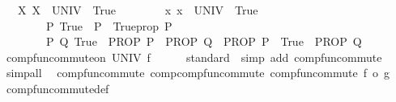 \begin{isabellebody}
\ \ \ {\isachardoublequoteopen}{\isasymAnd}X{\isachardot}{\kern0pt}\ {\isacharparenleft}{\kern0pt}X\ {\isasymsubseteq}\ UNIV{\isacharparenright}{\kern0pt}\ {\isasymequiv}\ True{\isachardoublequoteclose}\isanewline
\ \ \ \ \ \ \ \ {\isachardoublequoteopen}{\isasymAnd}x{\isachardot}{\kern0pt}\ x\ {\isasymin}\ UNIV\ {\isasymequiv}\ True{\isachardoublequoteclose}\isanewline
\ \ \ \ \ \ \ \ {\isachardoublequoteopen}{\isasymAnd}P{\isachardot}{\kern0pt}\ {\isacharparenleft}{\kern0pt}True\ {\isasymLongrightarrow}\ P{\isacharparenright}{\kern0pt}\ {\isasymequiv}\ Trueprop\ P{\isachardoublequoteclose}\isanewline
\ \ \ \ \ \ \ \ {\isachardoublequoteopen}{\isasymAnd}P\ Q{\isachardot}{\kern0pt}\ {\isacharparenleft}{\kern0pt}True\ {\isasymLongrightarrow}\ PROP\ P\ {\isasymLongrightarrow}\ PROP\ Q{\isacharparenright}{\kern0pt}\ {\isasymequiv}\ {\isacharparenleft}{\kern0pt}PROP\ P\ {\isasymLongrightarrow}\ True\ {\isasymLongrightarrow}\ PROP\ Q{\isacharparenright}{\kern0pt}{\isachardoublequoteclose}\isanewline
%
\isadelimproof
%
\endisadelimproof
%
\isatagproof
{}\isamarkupfalse%
\ {\isacharminus}{\kern0pt}\isanewline
\ \ \isamarkupfalse%
\ {\isachardoublequoteopen}comp{\isacharunderscore}{\kern0pt}fun{\isacharunderscore}{\kern0pt}commute{\isacharunderscore}{\kern0pt}on\ UNIV\ f{\isachardoublequoteclose}\isanewline
\ \ \ \ \isamarkupfalse%
\ standard\ \ {\isacharparenleft}{\kern0pt}simp\ add{\isacharcolon}{\kern0pt}\ comp{\isacharunderscore}{\kern0pt}fun{\isacharunderscore}{\kern0pt}commute{\isacharparenright}{\kern0pt}\isanewline
{}\isamarkupfalse%
\ simp{\isacharunderscore}{\kern0pt}all%
\endisatagproof
{\isafoldproof}%
%
\isadelimproof
\isanewline
%
\endisadelimproof
\isanewline
{}\isamarkupfalse%
\isanewline
\isanewline
{}\isamarkupfalse%
\ {\isacharparenleft}{\kern0pt}\ comp{\isacharunderscore}{\kern0pt}fun{\isacharunderscore}{\kern0pt}commute{\isacharparenright}{\kern0pt}\ comp{\isacharunderscore}{\kern0pt}comp{\isacharunderscore}{\kern0pt}fun{\isacharunderscore}{\kern0pt}commute{\isacharcolon}{\kern0pt}\ {\isachardoublequoteopen}comp{\isacharunderscore}{\kern0pt}fun{\isacharunderscore}{\kern0pt}commute\ {\isacharparenleft}{\kern0pt}f\ o\ g{\isacharparenright}{\kern0pt}{\isachardoublequoteclose}\isanewline
%
\isadelimproof
\ \ %
\endisadelimproof
%
\isatagproof
{}\isamarkupfalse%
\ comp{\isacharunderscore}{\kern0pt}fun{\isacharunderscore}{\kern0pt}commute{\isacharunderscore}{\kern0pt}def{\isacharprime}{\kern0pt}\ \isamarkupfalse%

\end{isabellebody}
